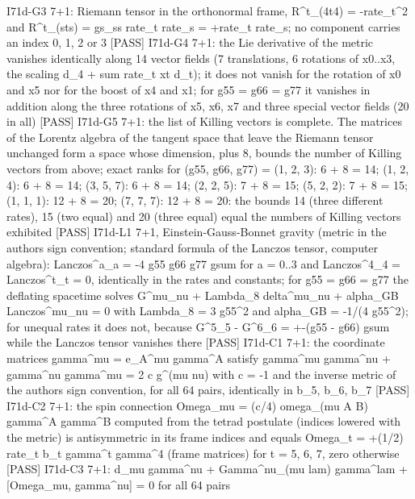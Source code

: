 \documentclass[
  10pt,
]{article}
\newenvironment{Shaded}{}{}
\newcommand{\NormalTok}[1]{#1}
\begin{document}
\begin{Shaded}
\begin{Highlighting}[]
\NormalTok{[PASS] I71d{-}G3  7+1: Riemann tensor in the orthonormal frame, R\^{}t\_(4t4) = {-}rate\_t\^{}2 and R\^{}t\_(sts) = gs\_ss rate\_t rate\_s = +rate\_t rate\_s; no component carries an index 0, 1, 2 or 3}
\NormalTok{[PASS] I71d{-}G4  7+1: the Lie derivative of the metric vanishes identically along 14 vector fields (7 translations, 6 rotations of x0..x3, the scaling d\_4 + sum rate\_t xt d\_t); it does not vanish for the rotation of x0 and x5 nor for the boost of x4 and x1; for g55 = g66 = g77 it vanishes in addition along the three rotations of x5, x6, x7 and three special vector fields (20 in all)}
\NormalTok{[PASS] I71d{-}G5  7+1: the list of Killing vectors is complete. The matrices of the Lorentz algebra of the tangent space that leave the Riemann tensor unchanged form a space whose dimension, plus 8, bounds the number of Killing vectors from above; exact ranks for (g55, g66, g77) = (1, 2, 3): 6 + 8 = 14; (1, 2, 4): 6 + 8 = 14; (3, 5, 7): 6 + 8 = 14; (2, 2, 5): 7 + 8 = 15; (5, 2, 2): 7 + 8 = 15; (1, 1, 1): 12 + 8 = 20; (7, 7, 7): 12 + 8 = 20: the bounds 14 (three different rates), 15 (two equal) and 20 (three equal) equal the numbers of Killing vectors exhibited}
\NormalTok{[PASS] I71d{-}L1  7+1, Einstein{-}Gauss{-}Bonnet gravity (metric in the author\textquotesingle{}s sign convention; standard formula of the Lanczos tensor, computer algebra): Lanczos\^{}a\_a = {-}4 g55 g66 g77 gsum for a = 0..3 and Lanczos\^{}4\_4 = Lanczos\^{}t\_t = 0, identically in the rates and constants; for g55 = g66 = g77 the deflating spacetime solves G\^{}mu\_nu + Lambda\_8 delta\^{}mu\_nu + alpha\_GB Lanczos\^{}mu\_nu = 0 with Lambda\_8 = 3 g55\^{}2 and alpha\_GB = {-}1/(4 g55\^{}2); for unequal rates it does not, because G\^{}5\_5 {-} G\^{}6\_6 = +{-}(g55 {-} g66) gsum while the Lanczos tensor vanishes there}
\NormalTok{[PASS] I71d{-}C1  7+1: the coordinate matrices gamma\^{}mu = e\_A\^{}mu gamma\^{}A satisfy gamma\^{}mu gamma\^{}nu + gamma\^{}nu gamma\^{}mu = 2 c g\^{}(mu nu) with c = {-}1 and the inverse metric of the author\textquotesingle{}s sign convention, for all 64 pairs, identically in b\_5, b\_6, b\_7}
\NormalTok{[PASS] I71d{-}C2  7+1: the spin connection Omega\_mu = (c/4) omega\_(mu A B) gamma\^{}A gamma\^{}B computed from the tetrad postulate (indices lowered with the metric) is antisymmetric in its frame indices and equals Omega\_t = +(1/2) rate\_t b\_t gamma\^{}t gamma\^{}4 (frame matrices) for t = 5, 6, 7, zero otherwise}
\NormalTok{[PASS] I71d{-}C3  7+1: d\_mu gamma\^{}nu + Gamma\^{}nu\_(mu lam) gamma\^{}lam + [Omega\_mu, gamma\^{}nu] = 0 for all 64 pairs}

\end{Highlighting}
\end{Shaded}
\end{document}
